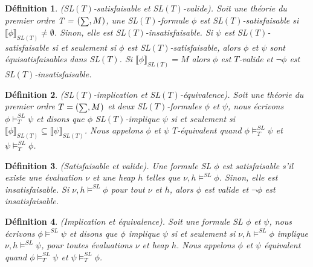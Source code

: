 \documentclass[11pt,openany]{article}
\newcommand\phibra{\llbracket\phi\rrbracket}
\newcommand\psibra{\llbracket\psi\rrbracket}
\newcommand\smallsum{\mathsmaller\sum}
\newtheorem{definition}{D\'efinition}[subsection]
\begin{document}
\begin{definition}
(SL$(T)$-satisfaisable et SL$(T)$-valide). Soit une th\'eorie du premier ordre T = $(\smallsum,M)$, une SL$(T)$-formule $\phi$ est SL$(T)$-satisfaisable si $\phibra_{SL(T)}\neq\emptyset$. Sinon, elle est SL$(T)$-insatisfaisable. Si $\psi$ est SL$(T)$-satisfaisable si et seulement si $\phi$ est SL$(T)$-satisfaisable, alors $\phi$ et $\psi$ sont \textit{\'equisatisfaisables} dans SL$(T)$. Si $\phibra_{SL(T)}=M$ alors $\phi$ est $T$-valide et $\neg\phi$ est SL$(T)$-insatisfaisable.
\end{definition}

\begin{definition}
(SL$(T)$-implication et SL$(T)$-\'equivalence). Soit une th\'eorie du premier ordre $T=(\smallsum,M)$ et deux SL$(T)$-formules $\phi$ et $\psi$, nous \'ecrivons $\phi\models^{SL}_{T}\psi$ et disons que $\phi$ SL$(T)$-implique $\psi$ si et seulement si $\phibra_{SL(T)}\subseteq\psibra_{SL(T)}$. Nous appelons $\phi$ et $\psi$ $T$-\'equivalent quand  $\phi\models^{SL}_{T}\psi$ et $\psi\models^{SL}_{T}\phi$. 
\end{definition}

\begin{definition}
(Satisfaisable et valide). Une formule SL $\phi$ est satisfaisable s'il existe une \'evaluation $\nu$ et une heap $h$ telles que $\nu,h\models^{SL}\phi$. Sinon, elle est \textit{insatisfaisable}. Si $\nu,h\models^{SL}\phi$ pour tout $\nu$ et $h$, alors $\phi$ est valide et $\neg\phi$ est insatisfaisable.
\end{definition}

\begin{definition}
(Implication et \'equivalence). Soit une formule SL $\phi$ et $\psi$, nous \'ecrivons $\phi\models^{SL}\psi$ et disons que $\phi$ implique $\psi$ si et seulement si $\nu,h\models^{SL}\phi$ implique $\nu,h\models^{SL}\psi$, pour toutes \'evaluations $\nu$ et heap $h$. Nous appelons $\phi$ et $\psi$ \'equivalent quand $\phi\models^{SL}_{T}\psi$ et $\psi\models^{SL}_{T}\phi$. 
\end{definition}
\end{document}
